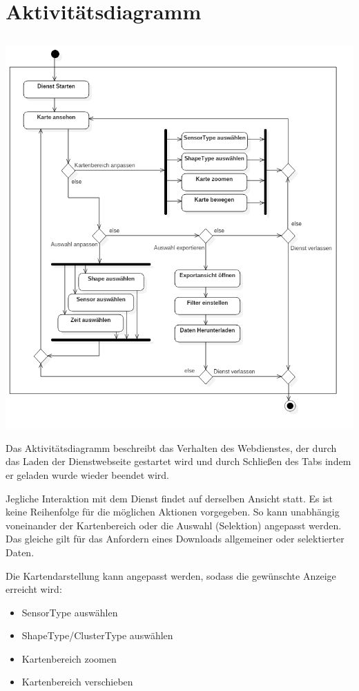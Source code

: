 \section{Aktivitätsdiagramm}
    \subsection{}
        \includegraphics[width=1\linewidth]{diagrams/ActivityDiagram1.png}
        
        Das Aktivitätsdiagramm beschreibt das Verhalten des Webdienstes, der durch das Laden der Dienstwebseite gestartet wird und durch Schließen des Tabs indem er geladen wurde wieder beendet wird.
        
        Jegliche Interaktion mit dem Dienst findet auf derselben Ansicht statt. Es ist keine Reihenfolge für die möglichen Aktionen vorgegeben. So kann unabhängig voneinander der Kartenbereich oder die Auswahl (Selektion) angepasst werden. Das gleiche gilt für das Anfordern eines Downloads allgemeiner oder selektierter Daten.
        
        Die Kartendarstellung kann angepasst werden, sodass die gewünschte Anzeige erreicht wird:
        \begin{itemize}
            \item SensorType auswählen
            \item ShapeType/ClusterType auswählen
            \item Kartenbereich zoomen
            \item Kartenbereich verschieben
        \end{itemize}


